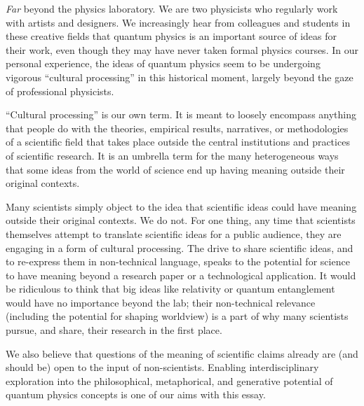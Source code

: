 \documentclass[onecolumn,preprintnumbers,amsmath,amssymbn,reprint,nofootinbib,superscriptaddress]{revtex4}    %
\begin{document}
{\em Far} beyond the physics laboratory.  We are two physicists who regularly work with artists and designers.  We increasingly hear from colleagues and students in these creative fields that quantum physics is an important source of ideas for their work, even though they may have never taken formal physics courses.  In our personal experience, the ideas of quantum physics seem to be undergoing vigorous ``cultural processing'' in this historical moment, largely beyond the gaze of professional physicists.  

``Cultural processing'' is our own term.  It is meant to loosely encompass anything that people do with the theories, empirical results, narratives, or methodologies of a scientific field that takes place outside the central institutions and practices of scientific research.  It is an umbrella term for the many heterogeneous ways that some ideas from the world of science end up having meaning outside their original contexts.

Many scientists simply object to the idea that scientific ideas could have meaning outside their original contexts.  We do not.  For one thing, any time that scientists themselves attempt to translate scientific ideas for a public audience, they are engaging in a form of cultural processing.  The drive to share scientific ideas, and to re-express them in non-technical language, speaks to the potential for science to have meaning beyond a research paper or a technological application.  It would be ridiculous to think that big ideas like relativity or quantum entanglement would have no importance beyond the lab; their non-technical relevance (including the potential for shaping worldview) is a part of why many scientists pursue, and share, their research in the first place.  

We also believe that questions of the meaning of scientific claims already are (and should be) open to the input of non-scientists.  Enabling interdisciplinary exploration into the philosophical, metaphorical, and generative potential of quantum physics concepts is one of our aims with this essay. 
\end{document}
